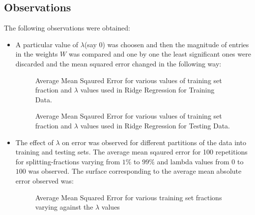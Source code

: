 \documentclass{article}
\begin{document}
\subsection*{Observations}
The following observations were obtained:
\begin{itemize}
\item A particular value of $\lambda$(say $0$) was choosen and then the magnitude of entries in the weights $W$ was compared and one by one the least significant ones were discarded and the mean squared error changed in the following way:

\begin{figure}[!h]
 \caption{Average Mean Sqaured Error for various values of training set fraction and $\lambda$ values used in Ridge Regression for Training Data.}
 \end{figure}
 
 \begin{figure}[!h]
 \caption{Average Mean Sqaured Error for various values of training set fraction and $\lambda$ values used in Ridge Regression for Testing Data.}
 \end{figure}

\item The effect of $\lambda$ on error was observed for different partitions of the data into training and testing sets. The average mean sqaured error for 100 repetitions for splitting-fractions varying from $1\%$ to $99\%$ and lambda values from $0$ to $100$ was observed. The surface corresponding to the average mean absolute error observed was:

\begin{figure}[!h]
 \caption{Average Mean Squared Error for various training set fractions varying against the $\lambda$ values}
 \end{figure}
 

\end{itemize}
\end{document}
